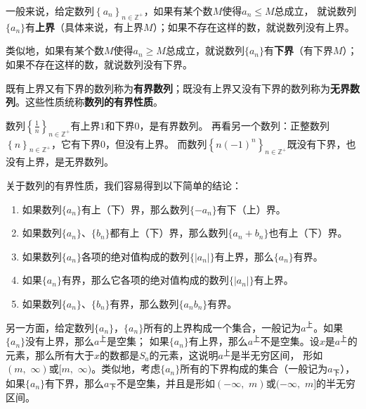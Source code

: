 \documentclass[12pt,UTF8]{ctexbook}
\begin{document}
一般来说，给定数列$\left\{a_n\right\}_{n\in\mathbb{Z}^+}$，如果有某个数$M$使得$a_n \leqslant M$总成立，
就说数列$\{a_n\}$有\textbf{上界}（具体来说，有上界$M$）；如果不存在这样的数，就说数列没有上界。

类似地，如果有某个数$M$使得$a_n \geqslant M$总成立，就说数列$\{a_n\}$有\textbf{下界}（有下界$M$）；如果不存在这样的数，就说数列没有下界。

既有上界又有下界的数列称为\textbf{有界数列}；既没有上界又没有下界的数列称为\textbf{无界数列}。这些性质统称\textbf{数列的有界性质}。

数列$\left\{\frac{1}{n}\right\}_{n\in\mathbb{Z}^+}$有上界$1$和下界$0$，是有界数列。
再看另一个数列：正整数列$\left\{n\right\}_{n\in\mathbb{Z}^+}$，它有下界$0$，但没有上界。
而数列$\left\{n(-1)^n\right\}_{n\in\mathbb{Z}^+}$既没有下界，也没有上界，是无界数列。

关于数列的有界性质，我们容易得到以下简单的结论：
\begin{enumerate}
    \item 如果数列$\{a_n\}$有上（下）界，那么数列$\{-a_n\}$有下（上）界。
    \item 如果数列$\{a_n\}$、$\{b_n\}$都有上（下）界，那么数列$\{a_n + b_n\}$也有上（下）界。
    \item 如果数列$\{a_n\}$各项的绝对值构成的数列$\{|a_n|\}$有上界，那么$\{a_n\}$有界。
    \item 如果$\{a_n\}$有界，那么它各项的绝对值构成的数列$\{|a_n|\}$有上界。
    \item 如果数列$\{a_n\}$、$\{b_n\}$有界，那么数列$\{a_n b_n\}$有界。
\end{enumerate}

另一方面，给定数列$\{a_n\}$，$\{a_n\}$所有的上界构成一个集合，一般记为$a^{\text{上}}$。如果$\{a_n\}$没有上界，那么$a^{\text{上}}$是空集；
如果$\{a_n\}$有上界，那么$a^{\text{上}}$不是空集。设$x$是$a^{\text{上}}$的元素，那么所有大于$x$的数都是$S_a$的元素，这说明$a^{\text{上}}$是半无穷区间，
形如$(m, \,\,\infty)$或$[m,\,\, \infty)$。类似地，考虑$\{a_n\}$所有的下界构成的集合（一般记为$a_{\text{下}}$），
如果$\{a_n\}$有下界，那么$a_{\text{下}}$不是空集，并且是形如$(-\infty,\,\, m)$或$(-\infty,\,\, m]$的半无穷区间。
\end{document}
